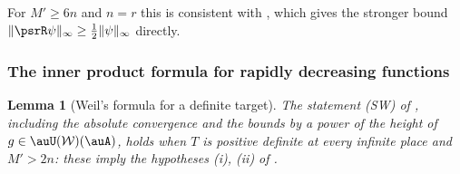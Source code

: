 \documentclass[10pt]{amsart}
\newtheorem{lemma}[theorem]{Lemma}
\theoremstyle{definition}
\theoremstyle{remark}
\begin{document}
\noindent For $M'\ge6n$ and $n=r$ this is consistent with {\cite[Lemma~2.11(c)]{P53}}, which gives
the stronger bound $\|\psrR\psi\|_\infty\ge\frac12\|\psi\|_\infty$ directly.

\subsubsection{The inner product formula for rapidly decreasing functions}\label{psr:ss-rallis}

\begin{lemma}[Weil's formula for a definite target]\label{psr:SW}
The statement \textup{(SW)} of {\cite[Lemma~2.13]{P53}}, including the absolute convergence and the bounds by
a power of the height of $g\in\auU(\mathcal W)(\auA)$, holds when $T$ is positive definite at every infinite place and $M'>2n$: these imply the
hypotheses (i), (ii) of {\cite[Lemma~2.13]{P53}}.
\end{lemma}
\end{document}
